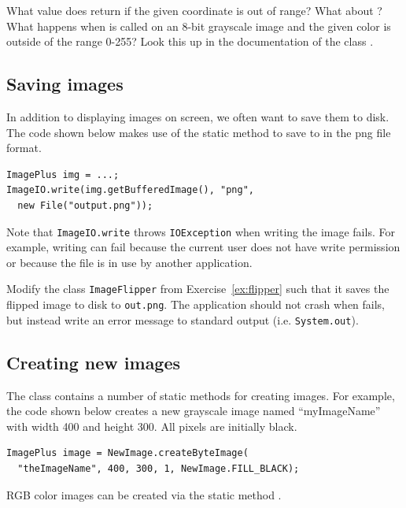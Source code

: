 \documentclass{book}
\begin{document}
\begin{exercise}
What value does  return if the given coordinate is out of range? What about ? What happens when  is called on an 8-bit grayscale image and the given color is outside of the range 0-255? Look this up in the documentation of the class \href{http://rsbweb.nih.gov/ij/developer/api/ij/process/ImageProcessor.html}{}.
\end{exercise}

\subsection{Saving images}\label{sec:saving-images}
In addition to displaying images on screen, we often want to save them to disk. The code shown below makes use of the static method  to save  to  in the png file format.
\begin{lstlisting}
ImagePlus img = ...;
ImageIO.write(img.getBufferedImage(), "png", 
  new File("output.png"));
\end{lstlisting}
Note that \texttt{ImageIO.write} throws \texttt{IOException} when writing the image fails. For example, writing can fail because the current user does not have write permission or because the file is in use by another application.

\begin{exercise}\label{ex:imageflipper2}
Modify the class \texttt{ImageFlipper} from Exercise~\ref{ex:flipper} such that it saves the flipped image to disk to \texttt{out.png}. The application should not crash when  fails, but instead write an error message to standard output (i.e.  \texttt{System.out}).
\end{exercise}

\subsection{Creating new images}
The class  contains a number of static methods for creating images. For example, the code shown below creates a new grayscale image named ``myImageName'' with width 400 and height 300. All pixels are initially black.
\begin{lstlisting}
ImagePlus image = NewImage.createByteImage(
  "theImageName", 400, 300, 1, NewImage.FILL_BLACK);
\end{lstlisting}
RGB color images can be created via the static method .
\end{document}
